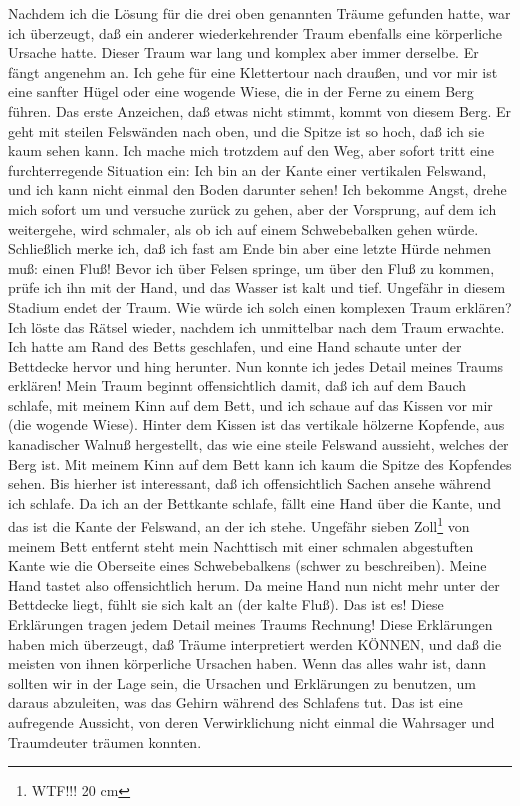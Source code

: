 Nachdem ich die Lösung für die drei oben genannten Träume gefunden hatte, war ich überzeugt, daß ein anderer wiederkehrender Traum ebenfalls eine körperliche Ursache hatte.
Dieser Traum war lang und komplex aber immer derselbe.
Er fängt angenehm an.
Ich gehe für eine Klettertour nach draußen, und vor mir ist eine sanfter Hügel oder eine wogende Wiese, die in der Ferne zu einem Berg führen.
Das erste Anzeichen, daß etwas nicht stimmt, kommt von diesem Berg.
Er geht mit steilen Felswänden nach oben, und die Spitze ist so hoch, daß ich sie kaum sehen kann.
Ich mache mich trotzdem auf den Weg, aber sofort tritt eine furchterregende Situation ein: Ich bin an der Kante einer vertikalen Felswand, und ich kann nicht einmal den Boden darunter sehen!
Ich bekomme Angst, drehe mich sofort um und versuche zurück zu gehen, aber der Vorsprung, auf dem ich weitergehe, wird schmaler, als ob ich auf einem Schwebebalken gehen würde.
Schließlich merke ich, daß ich fast am Ende bin aber eine letzte Hürde nehmen muß: einen Fluß!
Bevor ich über Felsen springe, um über den Fluß zu kommen, prüfe ich ihn mit der Hand, und das Wasser ist kalt und tief.
Ungefähr in diesem Stadium endet der Traum.
Wie würde ich solch einen komplexen Traum erklären?
Ich löste das Rätsel wieder, nachdem ich unmittelbar nach dem Traum erwachte.
Ich hatte am Rand des Betts geschlafen, und eine Hand schaute unter der Bettdecke hervor und hing herunter.
Nun konnte ich jedes Detail meines Traums erklären!
Mein Traum beginnt offensichtlich damit, daß ich auf dem Bauch schlafe, mit meinem Kinn auf dem Bett, und ich schaue auf das Kissen vor mir (die wogende Wiese).
Hinter dem Kissen ist das vertikale hölzerne Kopfende, aus kanadischer Walnuß hergestellt, das wie eine steile Felswand aussieht, welches der Berg ist.
Mit meinem Kinn auf dem Bett kann ich kaum die Spitze des Kopfendes sehen.
Bis hierher ist interessant, daß ich offensichtlich Sachen ansehe während ich schlafe.
Da ich an der Bettkante schlafe, fällt eine Hand über die Kante, und das ist die Kante der Felswand, an der ich stehe.
Ungefähr sieben Zoll\footnote{WTF!!! 20 cm} von meinem Bett entfernt steht mein Nachttisch mit einer schmalen abgestuften Kante wie die Oberseite eines Schwebebalkens (schwer zu beschreiben).
Meine Hand tastet also offensichtlich herum.
Da meine Hand nun nicht mehr unter der Bettdecke liegt, fühlt sie sich kalt an (der kalte Fluß). Das ist es!
Diese Erklärungen tragen jedem Detail meines Traums Rechnung!
Diese Erklärungen haben mich überzeugt, daß Träume interpretiert werden KÖNNEN, und daß die meisten von ihnen körperliche Ursachen haben.
Wenn das alles wahr ist, dann sollten wir in der Lage sein, die Ursachen und Erklärungen zu benutzen, um daraus abzuleiten, was das Gehirn während des Schlafens tut.
Das ist eine aufregende Aussicht, von deren Verwirklichung nicht einmal die Wahrsager und Traumdeuter träumen konnten.


